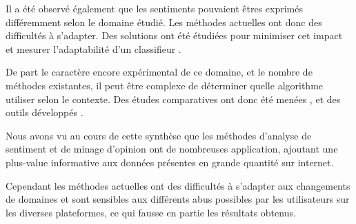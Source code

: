 \documentclass[8pt]{article}
\begin{document}
\par Il a été observé également que les sentiments pouvaient êtres exprimés différemment selon le domaine étudié. Les méthodes actuelles ont donc des difficultés à s’adapter. Des solutions ont été étudiées pour minimiser cet impact et mesurer l’adaptabilité d’un classifieur \cite{ressource15}.
\par De part le caractère encore expérimental de ce domaine, et le nombre de méthodes existantes, il peut être complexe de déterminer quelle algorithme utiliser selon le contexte. Des études comparatives ont donc été menées \cite{ressource29} \cite{ressource26}, et des outils développés \cite{ressource29} \cite{ressource19}.


\par Nous avons vu au cours de cette synthèse que les méthodes d’analyse de sentiment et de minage d’opinion ont de nombreuses application, ajoutant une plus-value informative aux données présentes en grande quantité sur internet.
\par Cependant les méthodes actuelles ont des difficultés à s’adapter aux changements de domaines et sont sensibles aux différents abus possibles par les utilisateurs sur les diverses plateformes, ce qui fausse en partie les résultats obtenus.


  \newpage

  
  
  \nocite{*}
\end{document}
